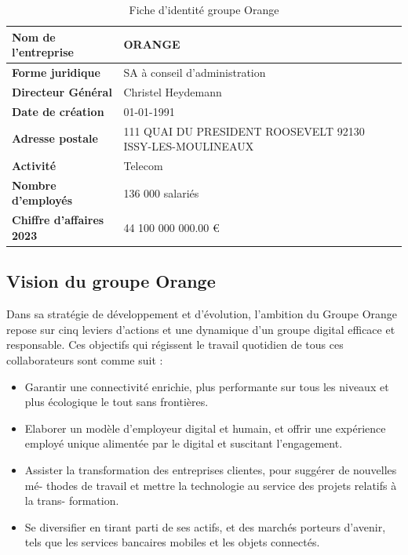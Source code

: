\begin{table}[h]
\centering
\begin{tabularx}{\textwidth}{|X|X|}
\hline
\textbf{Nom de l’entreprise} & ORANGE \\
\hline
\textbf{Forme juridique} & SA à conseil d’administration \\
\hline
\textbf{Directeur Général} & Christel Heydemann \\
\hline
\textbf{Date de création} & 01-01-1991 \\
\hline
\textbf{Adresse postale} & 111 QUAI DU PRESIDENT ROOSEVELT 92130 ISSY-LES-MOULINEAUX \\
\hline
\textbf{Activité} & Telecom \\
\hline
\textbf{Nombre d’employés} & 136 000 salariés \\
\hline
\textbf{Chiffre d’affaires 2023} & 44 100 000 000.00 \euro{} \\
\hline
\end{tabularx}
\caption{Fiche d’identité groupe Orange}
\label{tab:my_label}
\end{table}

\subsection{Vision du groupe Orange}

Dans sa stratégie de développement et d’évolution, l’ambition du Groupe Orange repose sur cinq leviers d’actions et une dynamique d’un groupe digital efficace et responsable. 
Ces objectifs qui régissent le travail quotidien de tous ces collaborateurs sont comme suit :

\begin{itemize}
    \item Garantir une connectivité enrichie, plus performante sur tous les niveaux et plus
    écologique le tout sans frontières.
    \item Elaborer un modèle d’employeur digital et humain, et offrir une expérience employé
    unique alimentée par le digital et suscitant l’engagement.
    \item Assister la transformation des entreprises clientes, pour suggérer de nouvelles mé-
    thodes de travail et mettre la technologie au service des projets relatifs à la trans-
    formation.
    \item Se diversifier en tirant parti de ses actifs, et des marchés porteurs d’avenir, tels que
    les services bancaires mobiles et les objets connectés.
\end{itemize}

